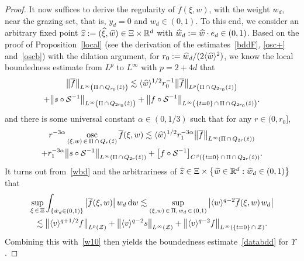 \documentclass[AHL,Unicode,longabstracts,published]{cedram}
\newcommand*{\dif}{\mathop{}\!\mathrm{d}}
\newcommand*\osc {\mathrm{osc}}
\newcommand*\R {\mathbb{R}}
\renewcommand*\SS {\mathcal{S}}
\newcommand*\Z {\mathcal{Z}}
\newcommand{\la}{\langle}
\newcommand{\ra}{\rangle}
\newcommand{\lv}{\langle v\rangle}
\let\oldhat\hat
\renewcommand*{\hat}[1]{\mathchoice{\widehat{#1}}{\widehat{#1}}{\oldhat{#1}}{\oldhat{#1}}}
\begin{document}
\begin{proof}
It now suffices to derive the regularity of $\overline{f}(\xi,w)$, with the weight $w_d$, near the grazing set, that is, $y_d=0$ and $w_d\in(0,1)$. To this end, we consider an arbitrary fixed point $\hat{z}:=(\hat{\xi},\hat{w})\in\Xi\times\R^d$ with $\hat{w}_d:=\hat{w}\cdot e_d\in(0,1)$. Based on the proof of Proposition~\ref{local} (see the derivation of the estimates~\eqref{bddF}, \eqref{osc+} and~\eqref{oscb}) with the dilation argument, for $r_0:=\hat{w}_d/(2\la\hat{w}\ra^2)$, we know the local boundedness estimate from $L^p$ to $L^\infty$ with $p=2+4d$ that
\begin{multline}\label{wbd}
\big\|\overline{f}\big\|_{L^\infty\left(\Pi\,\cap\,Q_{r_0}(\hat{z})\right)}
\lesssim \la\hat{w}\ra^{1/2}r_0^{-1}\big\|\overline{f}\big\|_{L^p\left(\Pi\,\cap\,Q_{2r_0}(\hat{z})\right)} \\
+ \big\|s\circ\SS^{-1}\big\|_{L^\infty\left(\Pi\,\cap\, Q_{2r_0}(\hat{z})\right)} + \big\|f\circ\SS^{-1}\big\|_{L^\infty\left(\{t=0\}\,\cap\,\Pi\,\cap\,Q_{2r_0}(\hat{z})\right)}.
\end{multline}
and there is some universal constant $\alpha\in(0,1/3)$ such that for any $r\in(0,r_0]$,
\begin{multline}\label{wholder}
{r}^{-3\alpha}\mathop{\osc}\limits_{(\xi,w)\,\in\,\Pi\,\cap\, Q_{{r}}(\hat{z})}\overline{f}(\xi,w)
\lesssim \la\hat{w}\ra^{1/2}r_1^{-3\alpha}\big\|\overline{f}\big\|_{L^\infty\left(\Pi\,\cap\,Q_{2{r}}(\hat{z})\right)}\\
+ r_1^{-3\alpha} \big\|s\circ\SS^{-1}\big\|_{L^\infty\left(\Pi\,\cap\,Q_{2{r}}(\hat{z})\right)} + \big[f\circ\SS^{-1}\big]_{C^\beta\left(\{t=0\}\,\cap\,\Pi\,\cap\,Q_{2{r}}(\hat{z})\right)}.
\end{multline}
It turns out from~\eqref{wbd} and the arbitrariness of $\hat{z}\in\Xi\times\big\{\hat{w}\in\R^d:\hat{w}_d\in(0,1)\big\}$ that
\begin{multline*}
\sup_{\xi\,\in\,\Xi}\int_{\left\{\hat{w}_d\in(0,1)\right\}} \big|\overline{f}(\xi,w)\big|\, w_d \dif w
\lesssim \sup_{(\xi,w)\,\in\,\Pi,\;\!w_d\,\in\,(0,1)} \big|\la w\ra^{q-2}\overline{f}(\xi,w)\;\!w_d\big| \\
\lesssim \big\|\lv^{q+1/2}f\big\|_{L^p(\Z)} +\big\|\lv^{q-2}s\big\|_{L^\infty(\Z)} +\big\|\lv^{q-2}f\big\|_{L^\infty(\{t=0\}\,\cap\,\Z)}.
\end{multline*}
Combining this with~\eqref{w10} then yields the boundedness estimate~\eqref{databdd} for $\Upsilon$.


\end{proof}
\end{document}
